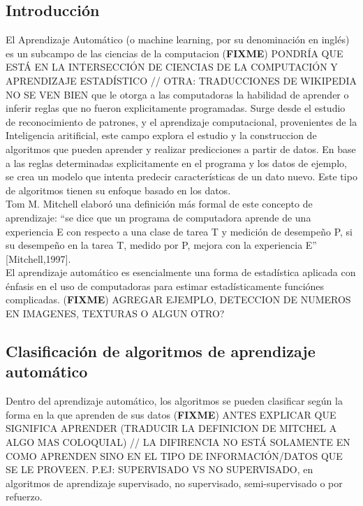 \documentclass[a4paper,11pt,spanish]{book}
\newcommand*{\FIXME}[1]{{(\textbf{FIXME}) {#1}}}
\begin{document}
    \subsection{Introducción}
      El Aprendizaje Automático (o machine learning, por su denominación en
      inglés) es un subcampo de las ciencias de la computacion \FIXME{PONDRÍA
        QUE ESTÁ EN LA INTERSECCIÓN DE CIENCIAS DE LA COMPUTACIÓN
      Y APRENDIZAJE ESTADÍSTICO // OTRA: TRADUCCIONES DE WIKIPEDIA NO SE VEN BIEN} que le otorga a las computadoras la habilidad de aprender o inferir reglas que no fueron explicitamente programadas.
      Surge desde el estudio de reconocimiento de patrones, y el aprendizaje computacional, provenientes de la Inteligencia aritificial, este campo explora el estudio y la construccion de algoritmos
      que pueden aprender y realizar predicciones a partir de datos. En base a las reglas determinadas explicitamente en el programa y los datos de ejemplo, se crea un modelo que intenta predecir
      características de un dato nuevo. Este tipo de algoritmos tienen su enfoque basado en los datos.\\
      Tom M. Mitchell elaboró una definición más formal de este concepto de aprendizaje: “se dice que un programa de computadora aprende de una experiencia E con respecto a una clase
      de tarea T y medición de desempeño P, si su desempeño en la tarea T, medido por P, mejora con la experiencia E” [Mitchell,1997].\\
      El aprendizaje automático es esencialmente una forma de estadística aplicada con énfasis en el uso de computadoras para estimar estadísticamente funciónes complicadas.
      \FIXME{AGREGAR EJEMPLO, DETECCION DE NUMEROS EN IMAGENES, TEXTURAS O ALGUN OTRO?}

    \subsection{Clasificación de algoritmos de aprendizaje automático}
      Dentro del aprendizaje automático, los algoritmos se pueden clasificar
      según la forma en la que aprenden de sus datos \FIXME{ANTES EXPLICAR QUE
        SIGNIFICA APRENDER (TRADUCIR LA DEFINICION DE MITCHEL A ALGO MAS
        COLOQUIAL) // LA DIFIRENCIA NO ESTÁ SOLAMENTE EN COMO APRENDEN SINO EN
        EL TIPO DE INFORMACIÓN/DATOS QUE SE LE PROVEEN. P.EJ: SUPERVISADO VS NO SUPERVISADO}, en algoritmos de aprendizaje supervisado, no supervisado,
      semi-supervisado o por refuerzo.
\end{document}
